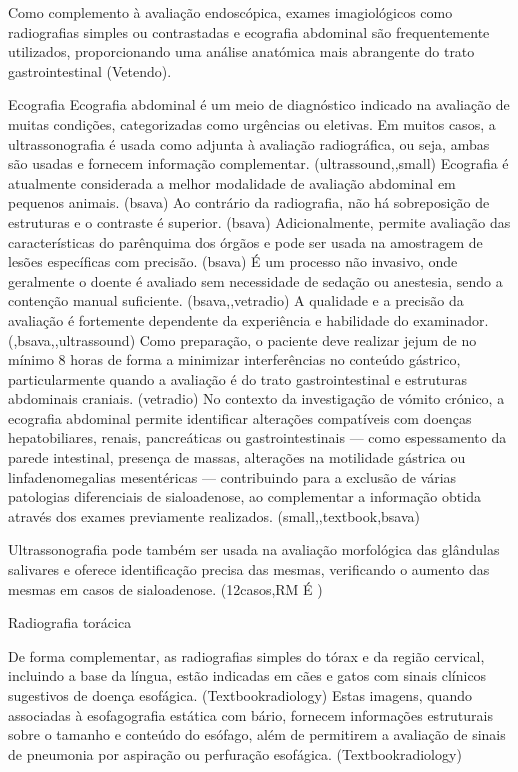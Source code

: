 Como complemento à avaliação endoscópica, exames imagiológicos como radiografias simples ou contrastadas e ecografia abdominal são frequentemente utilizados, proporcionando uma análise anatómica mais abrangente do trato gastrointestinal (Vetendo).


Ecografia 
Ecografia abdominal é um meio de diagnóstico indicado na avaliação de muitas condições, categorizadas como urgências ou eletivas. \cite{atlasultra} Em muitos casos, a ultrassonografia é usada como adjunta à avaliação radiográfica, ou seja, ambas são usadas e fornecem informação complementar. (ultrassound,\cite{atlasultra},small) Ecografia é atualmente considerada a melhor modalidade de avaliação abdominal em pequenos animais. (bsava) Ao contrário da radiografia, não há sobreposição de estruturas e o contraste é superior. (bsava) Adicionalmente, permite avaliação das características do parênquima dos órgãos e pode ser usada na amostragem de lesões específicas com precisão. (bsava) É um processo não invasivo, onde geralmente o doente é avaliado sem necessidade de sedação ou anestesia, sendo a contenção manual suficiente. (bsava,\cite{atlasultra},vetradio) A qualidade e a precisão da avaliação é fortemente dependente da experiência e habilidade do examinador. (\cite{Gommeren2022},bsava,\cite{atlasultra},ultrassound) Como preparação, o paciente deve realizar jejum de no mínimo 8 horas de forma a minimizar interferências no conteúdo gástrico, particularmente quando a avaliação é do trato gastrointestinal e estruturas abdominais craniais. (vetradio) No contexto da investigação de vómito crónico, a ecografia abdominal permite identificar alterações compatíveis com doenças hepatobiliares, renais, pancreáticas ou gastrointestinais — como espessamento da parede intestinal, presença de massas, alterações na motilidade gástrica ou linfadenomegalias mesentéricas — contribuindo para a exclusão de várias patologias diferenciais de sialoadenose, ao complementar a informação obtida através dos exames previamente realizados. (small,\cite{atlasultra},textbook,bsava)


Ultrassonografia pode também ser usada na avaliação morfológica das glândulas salivares e oferece identificação precisa das mesmas, verificando o aumento das mesmas em casos de sialoadenose. (12casos,RM É \cite{Gil2018})

Radiografia torácica


De forma complementar, as radiografias simples do tórax e da região cervical, incluindo a base da língua, estão indicadas em cães e gatos com sinais clínicos sugestivos de doença esofágica. (Textbookradiology) Estas imagens, quando associadas à esofagografia estática com bário, fornecem informações estruturais sobre o tamanho e conteúdo do esófago, além de permitirem a avaliação de sinais de pneumonia por aspiração ou perfuração esofágica. (Textbookradiology)


